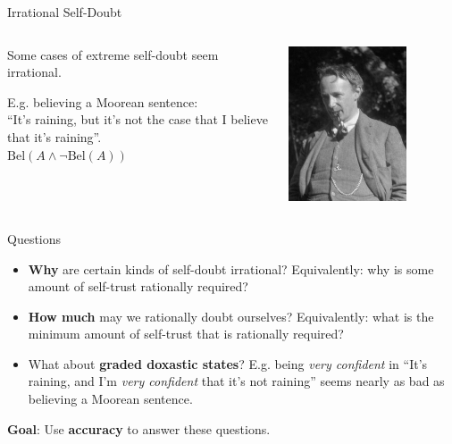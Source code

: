 \documentclass[aspectratio=169, dvipsnames]{beamer}
\begin{document}
\begin{frame}{Irrational Self-Doubt}
  \begin{columns}
    \begin{column}{.6\linewidth}
      Some cases of extreme self-doubt seem irrational.
      \vspace{20pt}
      
      E.g. believing a \alert{Moorean sentence}:\\
      ``It's raining, but it's not the case that I believe that it's raining''.\\
      $\text{Bel}(A \land \lnot \text{Bel}(A))$
    \end{column}
    \begin{column}{.38\linewidth}
      \begin{center}
      \includegraphics[width=0.7\textwidth]{GEMoore.jpg}
      \end{center}
    \end{column}
  \end{columns}
\end{frame}

\begin{frame}{Questions}
  \begin{itemize}
  \item \textbf{\alert{Why}} are certain kinds of self-doubt irrational? Equivalently: why is some amount of self-trust rationally
    required?
  \item \alert{\textbf{How much}} may we rationally doubt ourselves? Equivalently: what is the minimum amount of self-trust that is
    rationally required?
  \item What about \textbf{\alert{graded doxastic states}}? E.g. being \textit{very confident} in
    ``It's raining, and I'm \textit{very confident} that it's not raining'' seems nearly as bad as
    believing a Moorean sentence.
  \end{itemize}
  \textbf{Goal}: Use \textbf{\alert{accuracy}} to answer these questions.
\end{frame}
\end{document}
